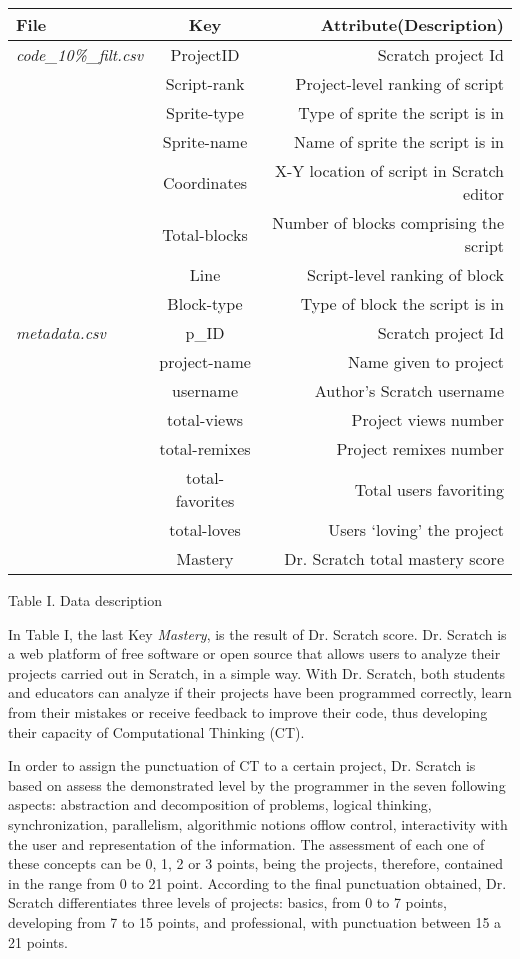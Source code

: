 \documentclass[a4paper,twocolumn,10pt]{article}
\begin{document}
\begin{center}
\begin{tabular}{ l | c | r  }
   \textbf{File} & \textbf{Key} & \textbf{Attribute(Description)} \\
 \hline  
   \textit{code\_10\%\_filt.csv} & ProjectID & Scratch project Id \\
    & Script-rank & Project-level ranking of script \\
    & Sprite-type & Type of sprite the script is in\\
    & Sprite-name & Name of sprite the script is in\\
    & Coordinates & X-Y location of script in Scratch editor\\
    & Total-blocks & Number of blocks comprising the script \\
    & Line & Script-level ranking of block \\
    & Block-type & Type of block the script is in\\
    \textit{metadata.csv} & p\_ID & Scratch project Id \\
    \hline
    & project-name & Name given to project \\
    & username & Author’s Scratch username\\
    & total-views & Project views number \\
    & total-remixes & Project remixes number \\
    & total-favorites & Total users favoriting \\
    & total-loves & Users ‘loving’ the project \\
    & Mastery & Dr. Scratch total mastery score\\
    \hline
    
\end{tabular}
Table I. Data description
\end{center}

\par In Table I, the last Key \textit{Mastery}, is the result of Dr. Scratch
score. Dr. Scratch is a web platform of free software or open source that 
allows users to analyze their projects carried out in Scratch, in a simple
way. With Dr. Scratch, both students and educators can analyze if their
projects have been programmed correctly, learn from their mistakes or
receive feedback to improve their code, thus developing their capacity of
Computational Thinking (CT). \par
In order to assign the punctuation of CT to a certain project, Dr. Scratch
is based on assess the demonstrated level by the programmer in the seven
following aspects: abstraction and decomposition of problems, logical
thinking, synchronization, parallelism, algorithmic notions offlow control, 
interactivity with the user and representation of the information. The 
assessment of each one of these concepts can be 0, 1, 2 or 3 points, being
the projects, therefore, contained in the range from 0 to 21 point. According
to the final punctuation obtained, Dr. Scratch differentiates three levels of
projects: basics, from 0 to 7 points, developing from 7 to 15 points, and
professional, with punctuation between 15 a 21 points.
\end{document}
